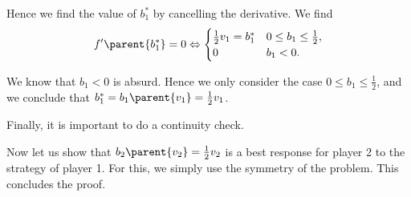 Hence we find the value of $b_1^{*}$ by cancelling the derivative. We find
\begin{equation*}
    f' \parent{b_1^{*}} = 0
    \Leftrightarrow 
    \begin{cases}
       \frac{1}{2} v_1 = b_1^{*}  & 0 \leq b_1 \leq \frac{1}{2}, \\
       0 & b_1 < 0.
     \end{cases}
\end{equation*}

We know that $b_1 < 0$ is absurd. Hence we only consider the case $0 \leq b_1 \leq \frac{1}{2}$, and we conclude that $b_1^{*} = b_1 \parent{v_1} = \frac{1}{2} v_1$. 

Finally, it is important to do a continuity check. 


\vspace{5mm}

Now let us show that $b_2 \parent{v_2} = \frac{1}{2} v_2$ is a best response for player 2 to the strategy of player 1. For this, we simply use the symmetry of the problem. This concludes the proof.
